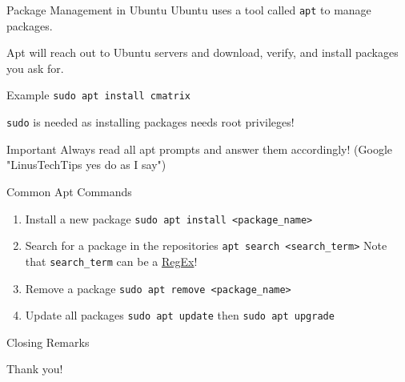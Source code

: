\documentclass{beamer}
\begin{document}
\begin{frame}{Package Management in Ubuntu}
	Ubuntu uses a tool called \texttt{apt} to manage packages.

	Apt will reach out to Ubuntu servers and download, verify, and install
	packages you ask for.

	\begin{exampleblock}{Example}
		\texttt{sudo apt install cmatrix}

		\texttt{sudo} is needed as installing packages needs root privileges!
	\end{exampleblock}
\end{frame}

\begin{frame}{Important}
	Always read all apt prompts and answer them accordingly!
	(Google "LinusTechTips yes do as I say")
\end{frame}

\begin{frame}{Common Apt Commands}
	\begin{enumerate}
		\item Install a new package \texttt{sudo apt install
			<package\_name>}
		\item Search for a package in the repositories \texttt{apt
			search <search\_term>} Note that \texttt{search\_term}
			can be a \underline{RegEx}!
		\item Remove a package \texttt{sudo apt remove <package\_name>}
		\item Update all packages \texttt{sudo apt update} then
			\texttt{sudo apt upgrade}
	\end{enumerate}
\end{frame}

\begin{frame}{Closing Remarks}
	\begin{center}
		\Huge Thank you!
	\end{center}
\end{frame}
\end{document}
